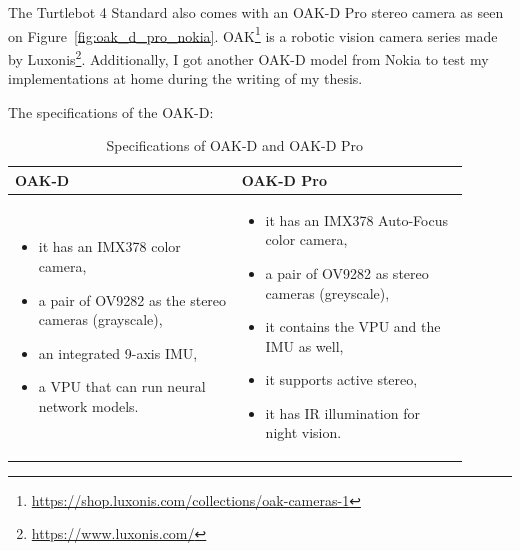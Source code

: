 The Turtlebot 4 Standard also comes with an OAK-D Pro stereo camera as seen on Figure~\ref{fig:oak_d_pro_nokia}. OAK\footnote{\url{https://shop.luxonis.com/collections/oak-cameras-1}} is a robotic vision camera series made by Luxonis\footnote{\url{https://www.luxonis.com/}}. Additionally, I got another OAK-D model from Nokia to test my implementations at home during the writing of my thesis.

The specifications of the OAK-D:
\begin{table}[h!]
\centering
\begin{tabular}{|>{\raggedright\arraybackslash}p{0.45\linewidth}|>{\raggedright\arraybackslash}p{0.45\linewidth}|}
\hline
\textbf{OAK-D} & \textbf{OAK-D Pro} \\
\hline
\begin{itemize}
    \setlength\itemsep{0em}
    \item it has an IMX378 color camera,
    \item a pair of OV9282 as the stereo cameras (grayscale),
    \item an integrated 9-axis IMU,
    \item a VPU that can run neural network models.
\end{itemize} &
\begin{itemize}
    \setlength\itemsep{0em}
    \item it has an IMX378 Auto-Focus color camera,
    \item a pair of OV9282 as stereo cameras (greyscale),
    \item it contains the VPU and the IMU as well,
    \item it supports active stereo,
    \item it has IR illumination for night vision.
\end{itemize} \\
\hline
\end{tabular}
\caption{Specifications of OAK-D and OAK-D Pro}
\end{table}


